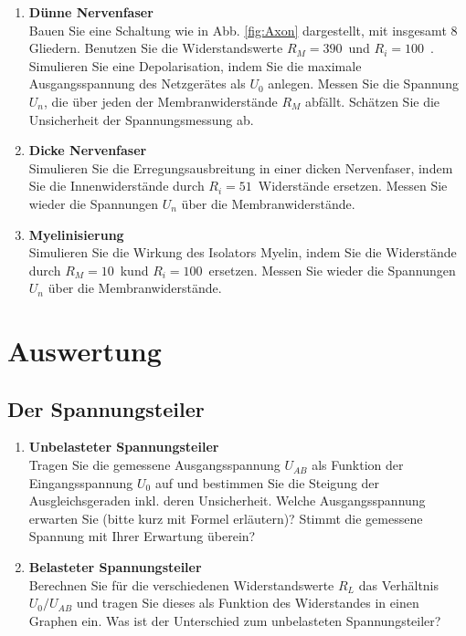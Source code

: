 \begin{enumerate}
	\item \textbf{Dünne Nervenfaser}\\
	Bauen Sie eine Schaltung wie in Abb. \ref{fig:Axon} dargestellt, mit insgesamt 8 Gliedern. Benutzen Sie die Widerstandswerte $R_M=390$~\Ohm und $R_i=100$~\Ohm. Simulieren Sie eine Depolarisation, indem Sie die maximale Ausgangsspannung des Netzgerätes als $U_0$ anlegen. Messen Sie die Spannung $U_n$, die über jeden der Membranwiderstände $R_M$ abfällt. Schätzen Sie die Unsicherheit der Spannungsmessung ab.
	\item \textbf{Dicke Nervenfaser}\\
	Simulieren Sie die Erregungsausbreitung in einer dicken Nervenfaser, indem Sie die Innenwiderstände durch $R_i=51$~\Ohm Widerstände ersetzen. Messen Sie wieder die Spannungen $U_n$ über die Membranwiderstände.
	\item \textbf{Myelinisierung}\\
	Simulieren Sie die Wirkung des Isolators Myelin, indem Sie die Widerstände durch $R_M=10$~k\Ohm und $R_i=100$~\Ohm ersetzen. Messen Sie wieder die Spannungen $U_n$ über die Membranwiderstände.
\end{enumerate}

\section{Auswertung} 
\subsection{Der Spannungsteiler}

\begin{enumerate}
	\item \textbf{Unbelasteter Spannungsteiler}\\
	Tragen Sie die gemessene Ausgangsspannung $U_{AB}$ als Funktion der Eingangsspannung $U_0$ auf und bestimmen Sie die Steigung der Ausgleichsgeraden inkl. deren Unsicherheit. Welche Ausgangsspannung erwarten Sie (bitte kurz mit Formel erläutern)? Stimmt die gemessene Spannung mit Ihrer Erwartung überein?
	\item \textbf{Belasteter Spannungsteiler}\\
	Berechnen Sie für die verschiedenen Widerstandswerte $R_L$ das Verhältnis $U_0/U_{AB}$ und tragen Sie dieses als Funktion des Widerstandes in einen Graphen ein. Was ist der Unterschied zum unbelasteten Spannungsteiler?
\end{enumerate}

